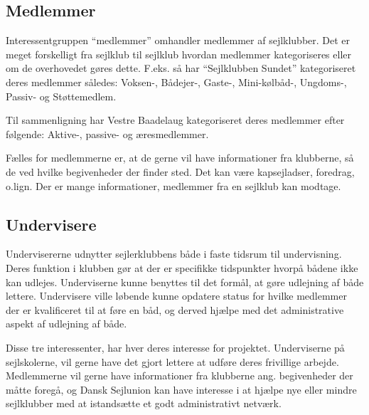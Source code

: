 \subsection{Medlemmer}

Interessentgruppen ``medlemmer'' omhandler medlemmer af sejlklubber. Det er meget forskelligt fra sejlklub til
sejlklub hvordan medlemmer kategoriseres eller om de overhovedet gøres dette. F.eks. så har ``Sejlklubben
Sundet'' kategoriseret deres medlemmer således: Voksen-, Bådejer-, Gaste-, Mini-kølbåd-, Ungdoms-, Passiv- og
Støttemedlem.

Til sammenligning har Vestre Baadelaug kategoriseret deres medlemmer efter følgende: Aktive-, passive- og
æresmedlemmer.

Fælles for medlemmerne er, at de gerne vil have informationer fra klubberne, så de ved hvilke begivenheder der finder sted. Det kan være kapsejladser, foredrag, o.lign. Der er mange informationer, medlemmer fra en sejlklub kan modtage.



\subsection{Undervisere}

Undervisererne udnytter sejlerklubbens både i faste tidsrum til undervisning. Deres funktion i
klubben gør at der er specifikke tidspunkter hvorpå bådene ikke kan udlejes. Underviserne kunne benyttes til
det formål, at gøre udlejning af både lettere. Undervisere ville løbende kunne opdatere status for hvilke
medlemmer der er kvalificeret til at føre en båd, og derved hjælpe med det administrative aspekt af udlejning
af både.

Disse tre interessenter, har hver deres interesse for projektet. Underviserne på sejlskolerne, vil gerne have det gjort lettere at udføre deres frivillige arbejde. Medlemmerne vil gerne have informationer fra klubberne ang. begivenheder der måtte foregå, og Dansk Sejlunion kan have interesse i at hjælpe nye eller mindre sejlklubber med at istandsætte et godt administrativt netværk.

